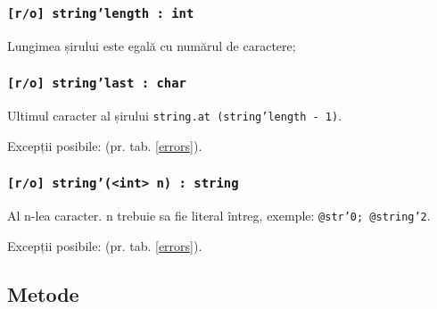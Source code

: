 \subsubsection{\texttt{[r/o] string'length : int}}

Lungimea șirului este egală cu numărul de caractere;

\subsubsection{\texttt{[r/o] string'last : char}}

Ultimul caracter al șirului \texttt{string.at (string'length - 1)}.

Excepții posibile:  (pr. tab. \ref{errors}).

\subsubsection{\texttt{[r/o] string'(<int> n) : string}}

Al n-lea caracter. n trebuie sa fie literal întreg, exemple: \texttt{@str'0; @string'2}.

Excepții posibile:  (pr. tab. \ref{errors}).

\subsection{Metode}

